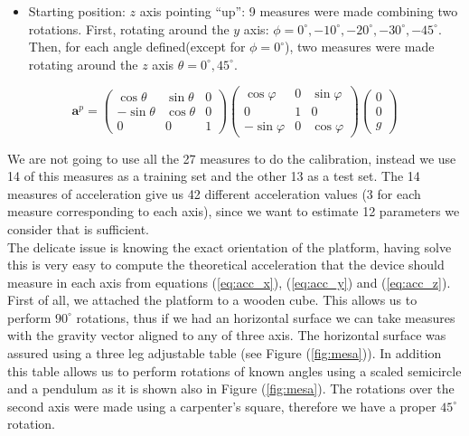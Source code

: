 \documentclass[conference]{IEEEtran}
\newcommand{\refp}[1]{(\ref{#1})}
\begin{document}
\begin{itemize}
\item Starting position: $z$ axis pointing ``up'': 9 measures were made combining two rotations. First, rotating around the $y$ axis: $\phi =0^\circ, -10^\circ, -20^\circ, -30^\circ, -45^\circ$. Then, for each angle defined(except for $\phi = 0^\circ$), two measures were made rotating around the $z$ axis $\theta = 0^\circ, 45^\circ$.   \end{itemize}

\begin{scriptsize}
\begin{equation}
\mathbf{a}^p = \left(\begin{array}{ccc}
\cos \theta & \sin \theta & 0\\
-\sin \theta & \cos \theta & 0\\
0 & 0 & 1
\end{array}\right)\left(\begin{array}{ccc}
\cos \varphi & 0 &\sin \varphi\\
0 & 1 & 0\\
-\sin \varphi & 0 & \cos \varphi
\end{array}\right)\left(\begin{array}{c}
0\\
0\\
g
\end{array}\right)
\label{eq:acc_z}
\end{equation}
\end{scriptsize}

We are not going to use all the 27 measures to do the calibration, instead we use 14 of this measures as a training set and the other 13 as a test set. The 14 measures of acceleration give us 42 different acceleration values (3 for each measure corresponding to each axis), since we want to estimate 12 parameters we consider that is sufficient.\\

The delicate issue is knowing the exact orientation of the platform, having solve this is very easy to compute the theoretical acceleration that the device should measure in each axis from equations \refp{eq:acc_x}, \refp{eq:acc_y} and \refp{eq:acc_z}.\\

First of all, we attached the platform to a wooden cube. This allows us to perform $90^\circ$ rotations, thus if we had an horizontal surface we can take measures with the gravity vector aligned to any of three axis. The horizontal surface was assured using a three leg adjustable table (see Figure \refp{fig:mesa}). In addition this table allows us to perform rotations of known angles using a scaled semicircle and a pendulum as it is shown also in Figure \refp{fig:mesa}. The rotations over the second axis were made using a carpenter's square, therefore we have a proper $45^\circ$ rotation.\\
\end{document}
